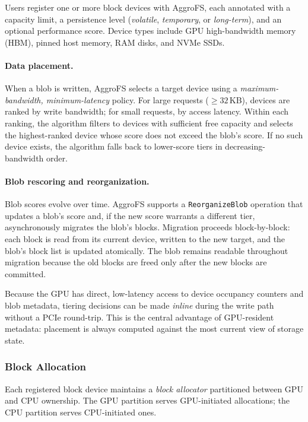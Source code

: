 Users register one or more block devices with AggroFS, each
annotated with a capacity limit, a persistence level
(\emph{volatile}, \emph{temporary}, or \emph{long-term}), and an
optional performance score.  Device types include GPU high-bandwidth
memory (HBM), pinned host memory, RAM disks, and NVMe SSDs.

\paragraph{Data placement.}
When a blob is written, AggroFS selects a target device using a
\emph{maximum-bandwidth, minimum-latency} policy.  For large
requests ($\geq 32$\,KB), devices are ranked by write bandwidth;
for small requests, by access latency.  Within each ranking, the
algorithm filters to devices with sufficient free capacity and
selects the highest-ranked device whose score does not exceed the
blob's score.  If no such device exists, the algorithm falls back
to lower-score tiers in decreasing-bandwidth order.

\paragraph{Blob rescoring and reorganization.}
Blob scores evolve over time.  AggroFS supports a
\texttt{ReorganizeBlob} operation that updates a blob's score and,
if the new score warrants a different tier, asynchronously migrates
the blob's blocks.  Migration proceeds block-by-block: each block
is read from its current device, written to the new target, and the
blob's block list is updated atomically.  The blob remains readable
throughout migration because the old blocks are freed only after
the new blocks are committed.

Because the GPU has direct, low-latency access to device occupancy
counters and blob metadata, tiering decisions can be made
\emph{inline} during the write path without a PCIe round-trip.
This is the central advantage of GPU-resident metadata: placement is
always computed against the most current view of storage state.

\subsubsection{Block Allocation}
\label{sec:block-alloc}

Each registered block device maintains a \emph{block allocator}
partitioned between GPU and CPU ownership.  The GPU partition serves
GPU-initiated allocations; the CPU partition serves CPU-initiated
ones.

